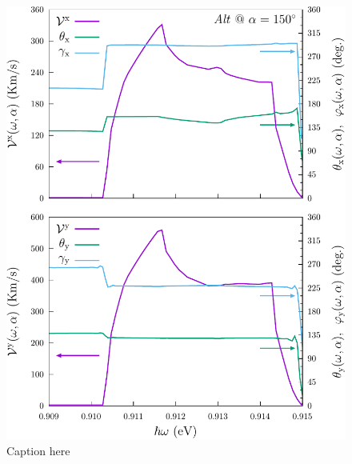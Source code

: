 \documentclass[prb,11pt,tightenlines,twocolumn,aps]{revtex4-1}
\begin{document}
\begin{figure}[tb]
    \centering
    \includegraphics[width=\linewidth]{altplots/alt-vx-vy-w2}
    \caption{Caption here}
    \label{fig:alt-vx-vy-w2}
\end{figure}
\end{document}
